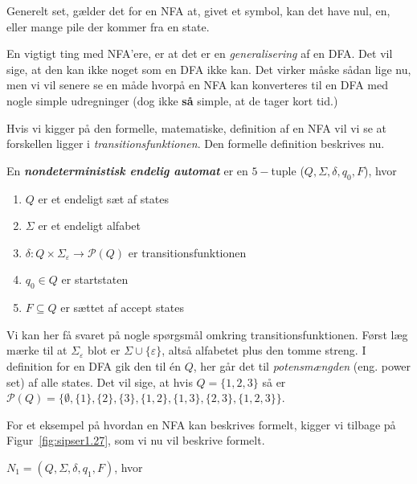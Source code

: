 Generelt set, gælder det for en NFA at, givet et symbol, kan det have nul, en, eller mange pile der kommer fra en state.

En vigtigt ting med NFA'ere, er at det er en \textit{generalisering} af en DFA. Det vil sige, at den kan ikke noget som en DFA ikke kan. Det virker måske sådan lige nu, men vi vil senere se en måde hvorpå en NFA kan konverteres til en DFA med nogle simple udregninger (dog ikke \textbf{så} simple, at de tager kort tid.)

Hvis vi kigger på den formelle, matematiske, definition af en NFA vil vi se at forskellen ligger i \textit{transitionsfunktionen}. Den formelle definition beskrives nu.

\begin{definition}
	\label{def:nfa}
	En \textbf{\textit{nondeterministisk endelig automat}} er en $5-$tuple ($Q, \Sigma, \delta, q_{0}, F$), hvor
	\begin{enumerate}
		\item $Q$ er et endeligt sæt af states
		\item $\Sigma$ er et endeligt alfabet
		\item $\delta : Q \times \Sigma_{\varepsilon} \rightarrow \mathcal{P}(Q)$ er transitionsfunktionen
		\item $q_{0} \in Q$ er startstaten
		\item $F \subseteq Q$ er sættet af accept states
	\end{enumerate}
\end{definition}

Vi kan her få svaret på nogle spørgsmål omkring transitionsfunktionen. Først læg mærke til at $\Sigma_{\varepsilon}$ blot er $\Sigma \cup \{\varepsilon\}$, altså alfabetet plus den tomme streng. I definition for en DFA gik den til én $Q$, her går det til \textit{potensmængden} (eng. power set) af alle states. Det vil sige, at hvis $Q = \{{1}, {2}, {3}\}$ så er $\mathcal{P}(Q) = \{\emptyset, \{1\}, \{2\}, \{3\}, \{1, 2\}, \{1, 3\}, \{2, 3\}, \{1,2,3\}\}$.

For et eksempel på hvordan en NFA kan beskrives formelt, kigger vi tilbage på Figur~\ref{fig:sipser1.27}, som vi nu vil beskrive formelt.

$N_{1} = (Q, \Sigma, \delta, q_{1}, F)$, hvor

